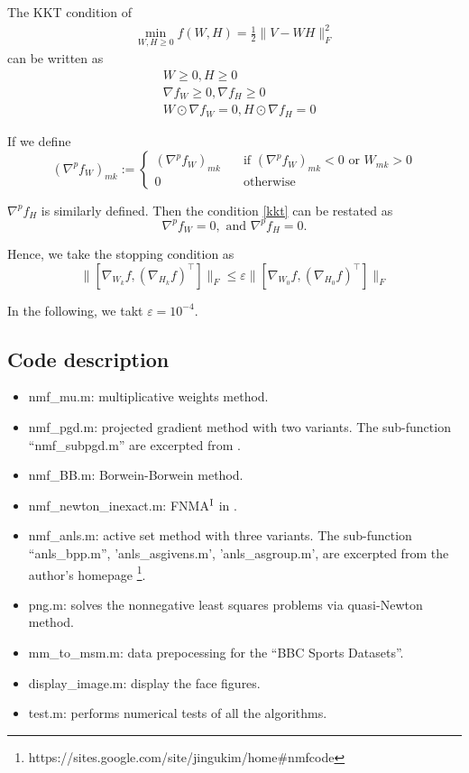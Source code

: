 \documentclass[conference,onecolumn,12pt]{IEEEtran}
\numberwithin{equation}{section}
\numberwithin{figure}{section}
\numberwithin{table}{section}
\theoremstyle{definition}
\begin{document}
The KKT condition of 
\begin{equation}
	\begin{split}
		\min_{W,H\geq 0} f(W,H) = \frac{1}{2}\|V-WH\|^2_F
	\end{split}
\end{equation}
can be written as
\begin{subequations}
\label{kkt}
	\begin{align}
		& W\geq 0, H\geq 0\\
		& \nabla f_W \geq 0, \nabla f_H\geq 0\\
		& W\odot \nabla f_W = 0, H\odot \nabla f_H  =0
	\end{align}
\end{subequations}

If we define
\begin{equation}
	(\nabla^p f_W)_{mk}:=\begin{cases}
		(\nabla^p f_W)_{mk}\quad & \text{if } (\nabla^p f_W)_{mk}<0 \text{ or } W_{mk}>0\\
	0\quad &\text{otherwise}
	\end{cases}
\end{equation}

$\nabla^p f_H$ is similarly defined. Then the condition \ref{kkt} can be restated as
\begin{equation}
	\nabla^p f_W =0,\text{ and }\nabla^p f_H = 0.
\end{equation}


Hence, we take the stopping condition as
\begin{equation}
	\|\left[\nabla_{W_k} f, (\nabla_{H_k} f)^\top\right]\|_F\leq \varepsilon \|\left[\nabla_{W_0} f, (\nabla_{H_0} f)^\top\right]\|_F
\end{equation}

In the following, we takt $\varepsilon=10^{-4}$.
\subsection{Code description}
\begin{itemize}
	\item nmf\_mu.m: multiplicative weights method.
	\item nmf\_pgd.m: projected gradient method with two variants. The sub-function ``nmf\_subpgd.m'' are excerpted from \cite{6795860}.
	\item nmf\_BB.m: Borwein-Borwein method.
	\item nmf\_newton\_inexact.m: FNMA$^{\rm I}$ in \cite{Sra}.
	\item nmf\_anls.m: active set method with three variants. The sub-function ``anls\_bpp.m'', 'anls\_asgivens.m', 'anls\_asgroup.m', are excerpted from the author's homepage \footnote{https://sites.google.com/site/jingukim/home\#nmfcode}.
	\item png.m: solves the nonnegative least squares problems via quasi-Newton method.
	\item mm\_to\_msm.m: data prepocessing for the ``BBC Sports Datasets''.
	\item display\_image.m: display the face figures.
	\item test.m: performs numerical tests of all the algorithms.
\end{itemize}
\end{document}
